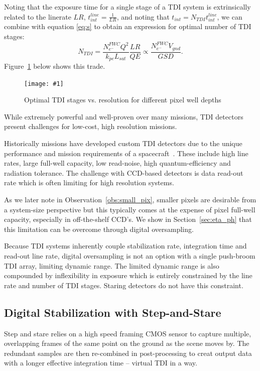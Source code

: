 \documentclass[10pt,journal]{IEEEtran}  %
\newcommand{\includefigure}[3]
{
  \begin{figure}[h!]
  \centering
  \texttt{[image: \#1]}
  \caption[]{#3}
  \label{#2}
  \end{figure}
}
\begin{document}
Noting that the exposure time for a single stage of a TDI system is extrinsically related to the linerate $LR$, $t_{int}^{line} = \frac{1}{LR}$, and noting that $t_{int} = N_{TDI}t_{int}^{line}$, we can combine with equation \eqref{eq:s} to obtain an expression for optimal number of TDI stages:
\begin{equation}
N_{TDI} =\frac{N_{e^-}^{FWC} Q^2}{k_{pe} L_{sat}}\frac{LR}{QE} \propto \frac{N_{e^-}^{FWC}V_{gnd}}{GSD}
\label{eq:n_tdi}.
\end{equation}
Figure~\ref{fig:n_tdi} below shows this trade.

\includefigure{figures/LR_req.pgf}{fig:n_tdi}{Optimal TDI stages vs. resolution for different pixel well depths}

While extremely powerful and well-proven over many missions, TDI detectors present challenges for low-cost, high resolution missions.

Historically missions have developed custom TDI detectors due to the unique performance and mission requirements of a spacecraft~\cite{jerram}.  These include high line rates, large full-well capacity, low read-noise, high quantum-efficiency and radiation tolerance.  The challenge with CCD-based detectors is data read-out rate which is often limiting for high resolution systems.

As we later note in Observation~\ref{obs:small_pix}, smaller pixels are desirable from a system-size perspective but this typically comes at the expense of pixel full-well capacity, especially in off-the-shelf CCD's.  We show in Section~\ref{sec:eta_ph} that this limitation can be overcome through digital oversampling. 

Because TDI systems inherently couple stabilization rate, integration time and read-out line rate, digital oversampling is not an option with a single push-broom TDI array, limiting dynamic range.  The limited dynamic range is also compounded by inflexibility in exposure which is entirely constrained by the line rate and number of TDI stages.  Staring detectors do not have this constraint.

\subsection{Digital Stabilization with Step-and-Stare}
Step and stare relies on a high speed framing CMOS sensor to capture multiple, overlapping frames of the same point on the ground as the scene moves by.  The redundant samples are then re-combined in post-processing to creat output data with a longer effective integration time -- virtual TDI in a way.
\end{document}
